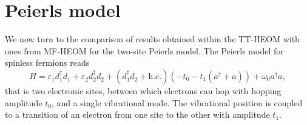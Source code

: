 \documentclass{article}
\newcommand{\pdagger}{{\phantom{\dagger}}}
\begin{document}
\section{Peierls model}
We now turn to the comparison of results obtained within the TT-HEOM with ones from MF-HEOM for the two-site Peierls model. The Peierls model for spinless fermions reads
\begin{equation}
	H = \varepsilon_1^\pdagger d_1^\dagger d_1^\pdagger +\varepsilon_2^\pdagger d_2^\dagger d_2^\pdagger +(d_1^\dagger d_2^\pdagger + \mathrm{h.c.})(-t_0 - t_1(a^\dagger + a)) + \omega_0 a^\dagger a,
\end{equation}
that is two electronic sites, between which electrons can hop with hopping amplitude $t_0$, and a single vibrational mode. The vibrational position is coupled to a transition of an electron from one site to the other with amplitude $t_1$. 
\end{document}
